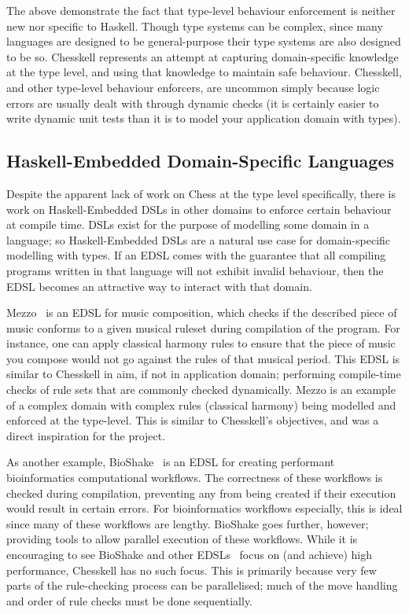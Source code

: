 The above demonstrate the fact that type-level behaviour enforcement is neither new nor specific to Haskell. Though type systems can be complex, since many languages are designed to be general-purpose their type systems are also designed to be so. Chesskell represents an attempt at capturing domain-specific knowledge at the type level, and using that knowledge to maintain safe behaviour. Chesskell, and other type-level behaviour enforcers, are uncommon simply because logic errors are usually dealt with through dynamic checks (it is certainly easier to write dynamic unit tests than it is to model your application domain with types).

\subsection{Haskell-Embedded Domain-Specific Languages}

Despite the apparent lack of work on Chess at the type level specifically, there is work on Haskell-Embedded DSLs in other domains to enforce certain behaviour at compile time. DSLs exist for the purpose of modelling some domain in a language; so Haskell-Embedded DSLs are a natural use case for domain-specific modelling with types. If an EDSL comes with the guarantee that all compiling programs written in that language will not exhibit invalid behaviour, then the EDSL becomes an attractive way to interact with that domain.

Mezzo~\cite{mezzohaskellsymposium} is an EDSL for music composition, which checks if the described piece of music conforms to a given musical ruleset during compilation of the program. For instance, one can apply classical harmony rules to ensure that the piece of music you compose would not go against the rules of that musical period. This EDSL is similar to Chesskell in aim, if not in application domain; performing compile-time checks of rule sets that are commonly checked dynamically. Mezzo is an example of a complex domain with complex rules (classical harmony) being modelled and enforced at the type-level. This is similar to Chesskell's objectives, and was a direct inspiration for the project.

As another example, BioShake~\cite{bioshake} is an EDSL for creating performant bioinformatics computational workflows. The correctness of these workflows is checked during compilation, preventing any from being created if their execution would result in certain errors. For bioinformatics workflows especially, this is ideal since many of these workflows are lengthy. BioShake goes further, however; providing tools to allow parallel execution of these workflows. While it is encouraging to see BioShake and other EDSLs~\cite{aplite} focus on (and achieve) high performance, Chesskell has no such focus. This is primarily because very few parts of the rule-checking process can be parallelised; much of the move handling and order of rule checks must be done sequentially.


